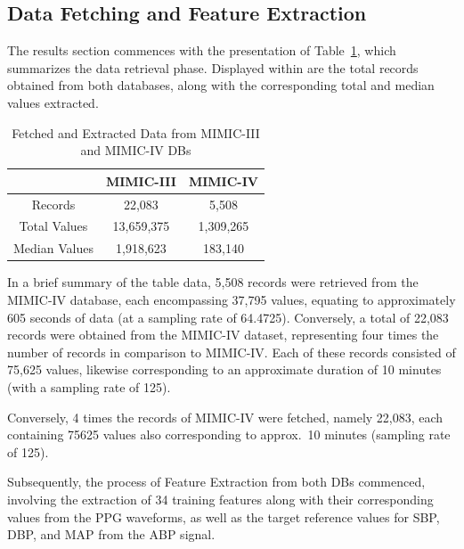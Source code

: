 \subsection{Data Fetching and Feature Extraction}
\label{subsec:results_data}

The results section commences with the presentation of Table~\ref{tab:records}, which summarizes the data retrieval phase.
Displayed within are the total records obtained from both databases, along with the corresponding total and median values extracted.

\begin{table}[h]
    \renewcommand{\arraystretch}{1.5}
    \setlength{\tabcolsep}{12pt}
    \begin{center}
        \begin{tabular}{ |c|c|c| }
            \hline
            & MIMIC-III  & MIMIC-IV  \\
            \hline
            Records       & 22,083     & 5,508     \\
            \hline
            Total Values  & 13,659,375 & 1,309,265 \\
            \hline
            Median Values & 1,918,623  & 183,140   \\
            \hline
        \end{tabular}
    \end{center}
    \captionsetup{format=plain, justification=centering}
    \caption{Fetched and Extracted Data from MIMIC-III and MIMIC-IV DBs}
    \label{tab:records}
\end{table}

In a brief summary of the table data, 5,508 records were retrieved from the MIMIC-IV database, each encompassing 37,795 values, equating to approximately 605 seconds of data (at a sampling rate of 64.4725).
Conversely, a total of 22,083 records were obtained from the MIMIC-IV dataset, representing four times the number of records in comparison to MIMIC-IV\@.
Each of these records consisted of 75,625 values, likewise corresponding to an approximate duration of 10 minutes (with a sampling rate of 125).

Conversely, 4 times the records of MIMIC-IV were fetched, namely 22,083, each containing 75625 values also corresponding to approx.\ 10 minutes (sampling rate of 125).

Subsequently, the process of Feature Extraction from both DBs commenced, involving the extraction of 34 training features along with their corresponding values from the PPG waveforms,
as well as the target reference values for SBP, DBP, and MAP from the ABP signal.


